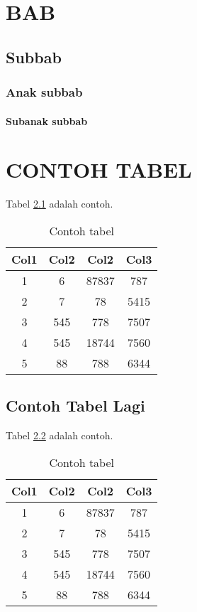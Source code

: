\chapter{BAB}
\lipsum[3]
\section{Subbab}
\lipsum[5]
\subsection{Anak subbab}
\lipsum[6]
\begin{quote}
\lipsum[1]
\end{quote}
\lipsum[2]
\subsubsection{Subanak subbab}
\lipsum[7]


\chapter{CONTOH TABEL}
Tabel \ref{table:1} adalah contoh.
\begin{table}[h]
\centering
\begin{tabular}{||c c c c||} 
 \hline
 Col1 & Col2 & Col2 & Col3 \\ [0.5ex] 
 \hline\hline
 1 & 6 & 87837 & 787 \\ 
 2 & 7 & 78 & 5415 \\
 3 & 545 & 778 & 7507 \\
 4 & 545 & 18744 & 7560 \\
 5 & 88 & 788 & 6344 \\ [1ex] 
 \hline
\end{tabular}
\caption{Contoh tabel}
\label{table:1}
\end{table}

\section{Contoh Tabel Lagi}
Tabel \ref{table:2} adalah contoh.
\begin{table}[h!]
\centering
\begin{tabular}{||c c c c||} 
 \hline
 Col1 & Col2 & Col2 & Col3 \\ [0.5ex] 
 \hline\hline
 1 & 6 & 87837 & 787 \\ 
 2 & 7 & 78 & 5415 \\
 3 & 545 & 778 & 7507 \\
 4 & 545 & 18744 & 7560 \\
 5 & 88 & 788 & 6344 \\ [1ex] 
 \hline
\end{tabular}
\caption{Contoh tabel}
\label{table:2}
\end{table}

